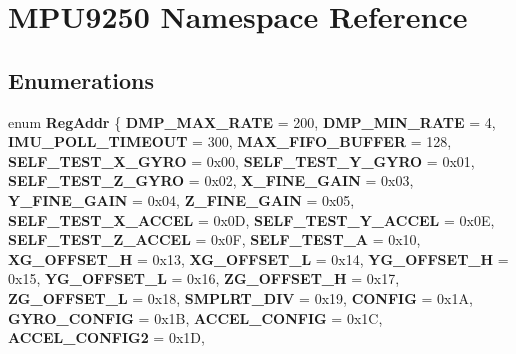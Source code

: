 \hypertarget{namespace_m_p_u9250}{}\section{M\+P\+U9250 Namespace Reference}
\label{namespace_m_p_u9250}
\subsection*{Enumerations}
\begin{DoxyCompactItemize}
\item 
\mbox{\label{namespace_m_p_u9250_abcb01dde4c110202b2934d5e3d98a32b}} 
enum {\bfseries Reg\+Addr} \{ \newline
{\bfseries D\+M\+P\+\_\+\+M\+A\+X\+\_\+\+R\+A\+TE} = 200, 
{\bfseries D\+M\+P\+\_\+\+M\+I\+N\+\_\+\+R\+A\+TE} = 4, 
{\bfseries I\+M\+U\+\_\+\+P\+O\+L\+L\+\_\+\+T\+I\+M\+E\+O\+UT} = 300, 
{\bfseries M\+A\+X\+\_\+\+F\+I\+F\+O\+\_\+\+B\+U\+F\+F\+ER} = 128, 
\newline
{\bfseries S\+E\+L\+F\+\_\+\+T\+E\+S\+T\+\_\+\+X\+\_\+\+G\+Y\+RO} = 0x00, 
{\bfseries S\+E\+L\+F\+\_\+\+T\+E\+S\+T\+\_\+\+Y\+\_\+\+G\+Y\+RO} = 0x01, 
{\bfseries S\+E\+L\+F\+\_\+\+T\+E\+S\+T\+\_\+\+Z\+\_\+\+G\+Y\+RO} = 0x02, 
{\bfseries X\+\_\+\+F\+I\+N\+E\+\_\+\+G\+A\+IN} = 0x03, 
\newline
{\bfseries Y\+\_\+\+F\+I\+N\+E\+\_\+\+G\+A\+IN} = 0x04, 
{\bfseries Z\+\_\+\+F\+I\+N\+E\+\_\+\+G\+A\+IN} = 0x05, 
{\bfseries S\+E\+L\+F\+\_\+\+T\+E\+S\+T\+\_\+\+X\+\_\+\+A\+C\+C\+EL} = 0x0D, 
{\bfseries S\+E\+L\+F\+\_\+\+T\+E\+S\+T\+\_\+\+Y\+\_\+\+A\+C\+C\+EL} = 0x0E, 
\newline
{\bfseries S\+E\+L\+F\+\_\+\+T\+E\+S\+T\+\_\+\+Z\+\_\+\+A\+C\+C\+EL} = 0x0F, 
{\bfseries S\+E\+L\+F\+\_\+\+T\+E\+S\+T\+\_\+A} = 0x10, 
{\bfseries X\+G\+\_\+\+O\+F\+F\+S\+E\+T\+\_\+H} = 0x13, 
{\bfseries X\+G\+\_\+\+O\+F\+F\+S\+E\+T\+\_\+L} = 0x14, 
\newline
{\bfseries Y\+G\+\_\+\+O\+F\+F\+S\+E\+T\+\_\+H} = 0x15, 
{\bfseries Y\+G\+\_\+\+O\+F\+F\+S\+E\+T\+\_\+L} = 0x16, 
{\bfseries Z\+G\+\_\+\+O\+F\+F\+S\+E\+T\+\_\+H} = 0x17, 
{\bfseries Z\+G\+\_\+\+O\+F\+F\+S\+E\+T\+\_\+L} = 0x18, 
\newline
{\bfseries S\+M\+P\+L\+R\+T\+\_\+\+D\+IV} = 0x19, 
{\bfseries C\+O\+N\+F\+IG} = 0x1A, 
{\bfseries G\+Y\+R\+O\+\_\+\+C\+O\+N\+F\+IG} = 0x1B, 
{\bfseries A\+C\+C\+E\+L\+\_\+\+C\+O\+N\+F\+IG} = 0x1C, 
\newline
{\bfseries A\+C\+C\+E\+L\+\_\+\+C\+O\+N\+F\+I\+G2} = 0x1D, 

\end{DoxyCompactItemize}
